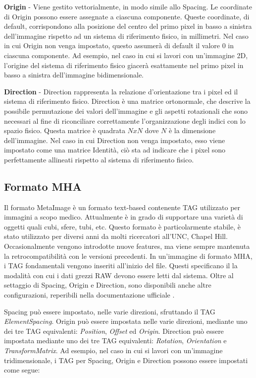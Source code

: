\documentclass[a4paper,12pt, doubleside]{report}
\begin{document}
                \bigskip
                \textbf{Origin} - Viene gestito vettorialmente, in modo simile allo Spacing. Le coordinate di Origin possono essere assegnate a ciascuna componente. Queste coordinate, di default, corrispondono alla posizione del centro del primo pixel in basso a sinistra dell'immagine rispetto ad un sistema di riferimento fisico, in millimetri. Nel caso in cui Origin non venga impostato, questo assumerà di default il valore $0$ in ciascuna componente. Ad esempio, nel caso in cui si lavori con un'immagine 2D, l'origine del sistema di riferimento fisico giacerà esattamente nel primo pixel in basso a sinistra dell'immagine bidimensionale. 
                
                \bigskip
                \textbf{Direction} - Direction rappresenta la relazione d'orientazione tra i pixel ed il sistema di riferimento fisico. Direction è una matrice ortonormale, che descrive la possibile permutazione dei valori dell'immagine e gli aspetti rotazionali che sono necessari al fine di riconciliare correttamente l'organizzazione degli indici con lo spazio fisico. Questa matrice è quadrata $NxN$ dove $N$ è la dimensione dell'immagine. Nel caso in cui Direction non venga impostato, esso viene impostato come una matrice Identità, ciò sta ad indicare che i pixel sono perfettamente allineati rispetto al sistema di riferimento fisico.
                
            \subsection{Formato MHA}
                \par
                    Il formato MetaImage è un formato text-based contenente TAG utilizzato per immagini a scopo medico. Attualmente è in grado di supportare una varietà di oggetti quali cubi, sfere, tubi, etc. Questo formato è particolarmente stabile, è stato utilizzato per diversi anni da molti ricercatori all'UNC, Chapel Hill. Occasionalmente vengono introdotte nuove features, ma viene sempre mantenuta la retrocompatibilità con le versioni precedenti. In un'immagine di formato MHA, i TAG fondamentali vengono inseriti all'inizio del file. Questi specificano il la modalità con cui i dati grezzi RAW devono essere letti dal sistema. Oltre al settaggio di Spacing, Origin e Direction, sono disponibili anche altre configurazioni, reperibili nella documentazione ufficiale \cite{mha-doc}. 
                    
                \bigskip
                \par
                    Spacing può essere impostato, nelle varie direzioni, sfruttando il TAG \textit{ElementSpacing}. Origin può essere impostata nelle varie direzioni, mediante uno dei tre TAG equivalenti: \textit{Position}, \textit{Offset} ed \textit{Origin}. Direction può essere impostata mediante uno dei tre TAG equivalenti: \textit{Rotation}, \textit{Orientation} e \textit{TransformMatrix}. Ad esempio, nel caso in cui si lavori con un'immagine tridimensionale, i TAG per Spacing, Origin e Direction possono essere impostati come segue:
                    
\end{document}
